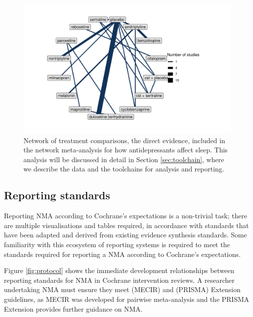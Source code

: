 \documentclass[12pt]{article}\usepackage[]{graphicx}\usepackage[]{color}
\makeatletter
\def\maxwidth{ %
  \ifdim\Gin@nat@width>\linewidth
    \linewidth
  \else
    \Gin@nat@width
  \fi
}
\newenvironment{knitrout}{}{} %
\makeatother
\begin{document}
\begin{figure}


\begin{knitrout}
\color{fgcolor}
\includegraphics[width=\maxwidth]{figure/network_fig-1} 

\end{knitrout}


\caption{Network of treatment comparisons, the direct evidence, included in the network meta-analysis for how antidepressants affect sleep. This analysis will be discussed in detail in Section \ref{sec:toolchain}, where we describe the data and the toolchains for analysis and reporting.}
\label{fig:network}
\end{figure}

\subsection{Reporting standards}

Reporting NMA according to Cochrane's expectations is a non-trivial task; there are multiple visualisations and tables required, in accordance with standards that have been adapted and derived from existing evidence synthesis standards. Some familiarity with this ecosystem of reporting systems is required to meet the standards required for reporting a NMA according to Cochrane's expectations.

Figure \ref{fig:protocol} shows the immediate development relationships between reporting standards for NMA in Cochrane intervention reviews. A researcher undertaking NMA must ensure they meet (MECIR) and (PRISMA) Extension guidelines, as MECIR was developed for pairwise meta-analysis and the PRISMA Extension provides further guidance on NMA.
\end{document}

